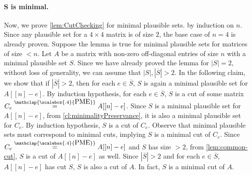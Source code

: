\documentclass[11pt,letterpaper]{article}
\newcommand{\comp}[1]{\overline{#1}}
\newcommand{\sgc}[1]{\textcolor{orange}{\guillemotleft \textbf{Sumanta:} #1\guillemotright}}
\newtheorem{lemma}{Lemma}[section]
\newtheorem{claim}{Claim}[section]
\newcommand{\PME}{\stackrel{\mathclap{\scalebox{.4}{\mbox{PME}}}}{=}}
\begin{document}
{{{

\paragraph{S is minimal.} 
Now, we prove \cref{lem:CutChecking} for minimal plausible sets. by induction on $n$. Since any plausible set for a $4 \times 4$ matrix is of size $2$, the base case of $n=4$ is already proven. Suppose the lemma is true for minimal plausible sets for matrices of size $< n$. Let $A$ be a matrix with non-zero off-diagonal entries of size $n$ with a minimal plausible set $S$. Since we have already proved the lemma for $|S|=2$, without loss of generality, we can assume that $|S|,|\comp{S}|> 2$. In the following claim, we show that if $|\comp{S}|>2$, then for each $e\in \comp{S}$, $S$ is again a minimal plausible set for $A[[n]-e]$. By induction hypothesis, for each $e\in \comp{S}$, $S$ is a cut of some matrix $C_e\PME A[[n]-e]$. Since $S$ is a minimal plausible set for $A[[n]-e]$, from \cref{cl:minimalityPreservance}, it is also a minimal plausible set for $C_e$. By induction hypothesis, $S$ is a cut of $C_e$. Observe that minimal plausible sets must correspond to minimal cuts, implying $S$ is a minimal cut of $C_e$. Since $C_e\PME A[[n]-e]$ and $S$ has size $>2$, from  \cref{lem:common-cut}, $S$ is a cut of $A[[n]-e]$ as well. Since $|\comp{S}|>2$ and for each $e\in \comp{S}$, $A[[n]-e]$ has cut $S$, $S$ is also a cut of $A$. In fact, $S$ is a minimal cut of $A$.\\
}}}
\end{document}
